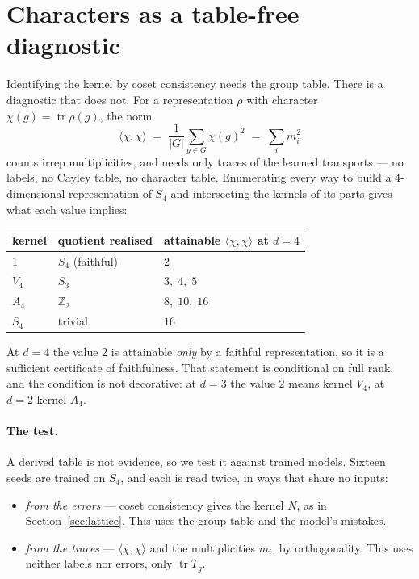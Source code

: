 \documentclass[10pt]{article}
\begin{document}
\section{Characters as a table-free diagnostic}
\label{sec:char}

Identifying the kernel by coset consistency needs the group table. There is a diagnostic that does
not. For a representation $\rho$ with character $\chi(g)=\operatorname{tr}\rho(g)$, the norm
\[
  \langle\chi,\chi\rangle \;=\; \frac{1}{|G|}\sum_{g\in G}\chi(g)^2 \;=\; \sum_i m_i^2
\]
counts irrep multiplicities, and needs only traces of the learned transports --- no labels, no Cayley
table, no character table. Enumerating every way to build a $4$-dimensional representation of $S_4$
and intersecting the kernels of its parts gives what each value implies:

\begin{center}\small
\begin{tabular}{lll}
\toprule
kernel & quotient realised & attainable $\langle\chi,\chi\rangle$ at $d=4$ \\
\midrule
$1$ & $S_4$ (faithful) & $2$ \\
$V_4$ & $S_3$ & $3,\;4,\;5$ \\
$A_4$ & $\mathbb{Z}_2$ & $8,\;10,\;16$ \\
$S_4$ & trivial & $16$ \\
\bottomrule
\end{tabular}
\end{center}

At $d=4$ the value $2$ is attainable \emph{only} by a faithful representation, so it is a sufficient
certificate of faithfulness. That statement is conditional on full rank, and the condition is not
decorative: at $d=3$ the value $2$ means kernel $V_4$, at $d=2$ kernel $A_4$.

\paragraph{The test.} A derived table is not evidence, so we test it against trained models. Sixteen
seeds are trained on $S_4$, and each is read twice, in ways that share no inputs:

\begin{itemize}[leftmargin=*,itemsep=1.5pt,topsep=3pt]
  \item \emph{from the errors} --- coset consistency gives the kernel $N$, as in
        Section~\ref{sec:lattice}. This uses the group table and the model's mistakes.
  \item \emph{from the traces} --- $\langle\chi,\chi\rangle$ and the multiplicities $m_i$, by
        orthogonality. This uses neither labels nor errors, only $\operatorname{tr}T_g$.
\end{itemize}
\end{document}
